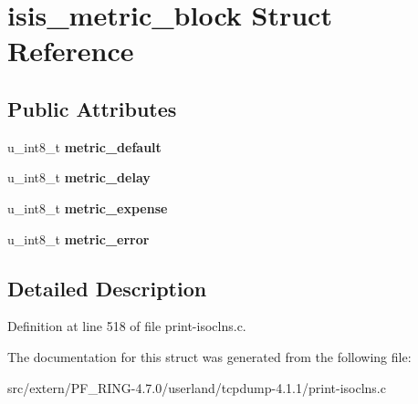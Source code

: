 \hypertarget{structisis__metric__block}{
\section{isis\_\-metric\_\-block Struct Reference}
\label{structisis__metric__block}
}
\subsection*{Public Attributes}
\begin{DoxyCompactItemize}
\item 
\hypertarget{structisis__metric__block_a64dc3de9ea71aab5cfba55fe55611391}{
u\_\-int8\_\-t {\bfseries metric\_\-default}}
\label{structisis__metric__block_a64dc3de9ea71aab5cfba55fe55611391}

\item 
\hypertarget{structisis__metric__block_a7c7ceaba6a1cbdcb9d725ce723a54c59}{
u\_\-int8\_\-t {\bfseries metric\_\-delay}}
\label{structisis__metric__block_a7c7ceaba6a1cbdcb9d725ce723a54c59}

\item 
\hypertarget{structisis__metric__block_a336a834a7d5f9b811859c31e42949048}{
u\_\-int8\_\-t {\bfseries metric\_\-expense}}
\label{structisis__metric__block_a336a834a7d5f9b811859c31e42949048}

\item 
\hypertarget{structisis__metric__block_ad8196051146f62861ebcc09bec78ef2e}{
u\_\-int8\_\-t {\bfseries metric\_\-error}}
\label{structisis__metric__block_ad8196051146f62861ebcc09bec78ef2e}

\end{DoxyCompactItemize}


\subsection{Detailed Description}


Definition at line 518 of file print-\/isoclns.c.



The documentation for this struct was generated from the following file:\begin{DoxyCompactItemize}
\item 
src/extern/PF\_\-RING-\/4.7.0/userland/tcpdump-\/4.1.1/print-\/isoclns.c\end{DoxyCompactItemize}
